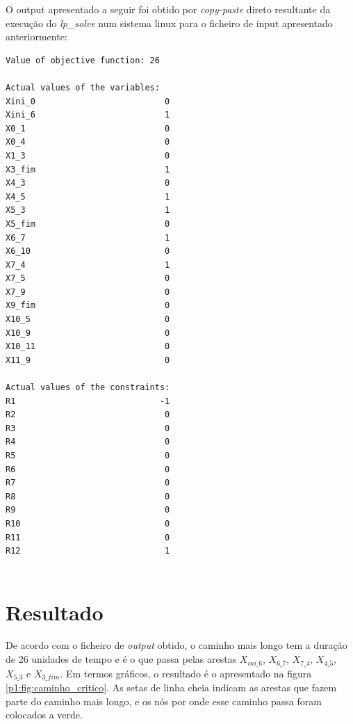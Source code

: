 O output apresentado a seguir foi obtido por \emph{copy-paste} direto resultante da execução do \emph{lp\_solve} num sistema linux para o ficheiro de input apresentado anteriormente:

\begin{verbatim}
Value of objective function: 26

Actual values of the variables:
Xini_0                          0
Xini_6                          1
X0_1                            0
X0_4                            0
X1_3                            0
X3_fim                          1
X4_3                            0
X4_5                            1
X5_3                            1
X5_fim                          0
X6_7                            1
X6_10                           0
X7_4                            1
X7_5                            0
X7_9                            0
X9_fim                          0
X10_5                           0
X10_9                           0
X10_11                          0
X11_9                           0

Actual values of the constraints:
R1                             -1
R2                              0
R3                              0
R4                              0
R5                              0
R6                              0
R7                              0
R8                              0
R9                              0
R10                             0
R11                             0
R12                             1


\end{verbatim}

\newpage

\section{Resultado}

De acordo com o ficheiro de \emph{output} obtido, o caminho mais longo tem a duração de 26 unidades de tempo e é o que
passa pelas arestas $X_{ini\_6}$, $X_{6\_7}$, $X_{7\_4}$, $X_{4\_5}$, $X_{5\_3}$
e $X_{3\_fim}$. Em termos gráficos, o resultado é o apresentado na figura \ref{p1:fig:caminho_critico}. As
setas de linha cheia indicam as arestas que fazem parte do caminho mais longo,
e os nós por onde esse caminho passa foram colocados a verde.

